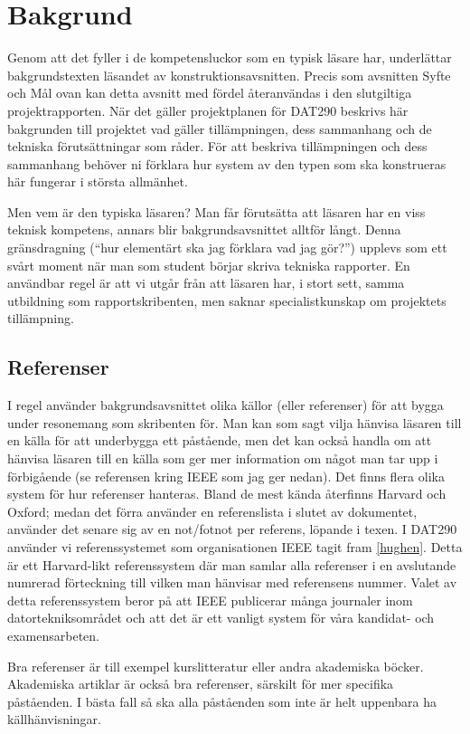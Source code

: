 \documentclass{article}
\begin{document}
\section{Bakgrund}
Genom att det fyller i de kompetensluckor som en typisk läsare har, underlättar bakgrundstexten läsandet av konstruktionsavsnitten. Precis som avsnitten
Syfte och Mål ovan kan detta avsnitt med fördel återanvändas i den slutgiltiga projektrapporten. När det gäller projektplanen för DAT290 beskrivs här
bakgrunden till projektet vad gäller tillämpningen, dess sammanhang och de
tekniska förutsättningar som råder. För att beskriva tillämpningen och dess
sammanhang behöver ni förklara hur system av den typen som ska konstrueras
här fungerar i största allmänhet.\par
Men vem är den typiska läsaren? Man får förutsätta att läsaren har en viss
teknisk kompetens, annars blir bakgrundsavsnittet alltför långt. Denna gränsdragning (“hur elementärt ska jag förklara vad jag gör?”) upplevs som ett svårt moment när man som student börjar skriva tekniska rapporter. En användbar
regel är att vi utgår från att läsaren har, i stort sett, samma utbildning som
rapportskribenten, men saknar specialistkunskap om projektets tillämpning.

\subsection{Referenser}
I regel använder bakgrundsavsnittet olika källor (eller referenser) för att bygga
under resonemang som skribenten för. Man kan som sagt vilja hänvisa läsaren
till en källa för att underbygga ett påstående, men det kan också handla om
att hänvisa läsaren till en källa som ger mer information om något man tar
upp i förbigående (se referensen kring IEEE som jag ger nedan). Det finns flera
olika system för hur referenser hanteras. Bland de mest kända återfinns Harvard
och Oxford; medan det förra använder en referenslista i slutet av dokumentet,
använder det senare sig av en not/fotnot per referens, löpande i texen. I DAT290
använder vi referenssystemet som organisationen IEEE tagit fram \ref{hughen}. Detta är
ett Harvard-likt referenssystem där man samlar alla referenser i en avslutande
numrerad förteckning till vilken man hänvisar med referensens nummer. Valet
av detta referenssystem beror på att IEEE publicerar många journaler inom
datortekniksområdet och att det är ett vanligt system för våra kandidat- och
examensarbeten.\par
Bra referenser är till exempel kurslitteratur eller andra akademiska böcker.
Akademiska artiklar är också bra referenser, särskilt för mer specifika påståenden. I bästa fall så ska alla påståenden som inte är helt uppenbara ha källhänvisningar.
\end{document}
